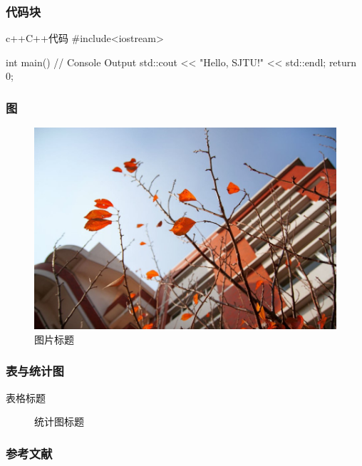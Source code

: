 \documentclass[
    aspectratio=169,                   %
]{beamer}
\begin{document}
    \begin{frame}[fragile]          %
        \frametitle{代码块}
        \begin{codeblock}{c++}{C++代码}
#include<iostream>

int main(){
    // Console Output
    std::cout << "Hello, SJTU!" << std::endl;
    return 0;
}
        \end{codeblock}
    \end{frame}

    \begin{frame}
        \frametitle{图}
        \begin{figure}
            \centering
            \begin{stampbox}
                \includegraphics[height=0.3\textheight]{vi/plant.jpg}
            \end{stampbox}
            \caption{图片标题\cite{viman}}
        \end{figure}
    \end{frame}

    \begin{frame}
        \frametitle{表与统计图}
        \begin{multicols}{2}
        \begin{table}
            \caption{表格标题\cite{pgfplotstableman}}
        \end{table}
        
        \begin{figure}
            
            \caption{统计图标题\cite{pgfplotsman}}
        \end{figure}
        \end{multicols}
    \end{frame}

\appendix

    \begin{frame}
        \frametitle{参考文献}
        \printbibliography[title=参考文献]
    \end{frame}

    \makebottom     %
\end{document}
